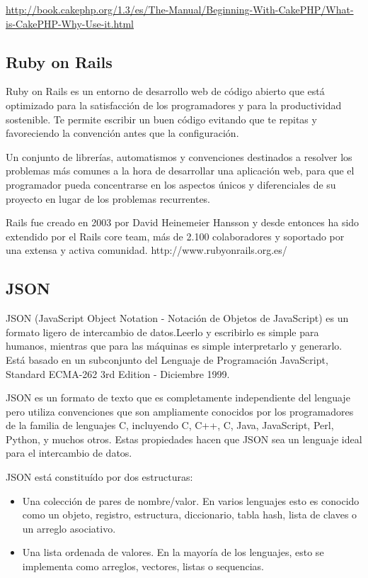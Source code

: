 \url{http://book.cakephp.org/1.3/es/The-Manual/Beginning-With-CakePHP/What-is-CakePHP-Why-Use-it.html}

\subsection{Ruby on Rails}
\setlength{\parskip}{5mm}
Ruby on Rails es un entorno de desarrollo web de código abierto que está optimizado para la satisfacción de los programadores y para la productividad sostenible. Te permite escribir un buen código evitando que te repitas y favoreciendo la convención antes que la configuración.

Un conjunto de librerías, automatismos y convenciones destinados a resolver los problemas más comunes a la hora de desarrollar una aplicación web, para que el programador pueda concentrarse en los aspectos únicos y diferenciales de su proyecto en lugar de los problemas recurrentes.

Rails fue creado en 2003 por David Heinemeier Hansson y desde entonces ha sido extendido por el Rails core team, más de 2.100 colaboradores y soportado por una extensa y activa comunidad.
\setlength{\parskip}{0mm}
http://www.rubyonrails.org.es/

\subsection{JSON}
\setlength{\parskip}{5mm}
JSON (JavaScript Object Notation - Notación de Objetos de JavaScript) es un formato ligero de intercambio de datos.Leerlo y escribirlo es simple para humanos, mientras que para las máquinas es simple interpretarlo y generarlo. Está basado en un subconjunto del Lenguaje de Programación JavaScript, Standard ECMA-262 3rd Edition - Diciembre 1999. 

JSON es un formato de texto que es completamente independiente del lenguaje pero utiliza convenciones que son ampliamente conocidos por los programadores de la familia de lenguajes C, incluyendo C, C++, C, Java, JavaScript, Perl, Python, y muchos otros. Estas propiedades hacen que JSON sea un lenguaje ideal para el intercambio de datos.

JSON está constituído por dos estructuras:
 \setlength{\parskip}{0mm}
\begin{itemize}

	\item Una colección de pares de nombre/valor. En varios lenguajes esto es conocido como un objeto, registro, estructura, diccionario, tabla hash, lista de claves o un arreglo asociativo.
	
	\item Una lista ordenada de valores. En la mayoría de los lenguajes, esto se implementa como arreglos, vectores, listas o sequencias.

	
\end{itemize}


